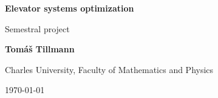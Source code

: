 \documentclass[10pt, a4paper]{article}
\begin{document}
\begin{titlepage}
    \begin{center}
        \vspace*{3cm}
            
        \Huge
        \textbf{Elevator systems optimization}
            
        \vspace{1cm}
        \huge
        Semestral project
            
        \vspace{1.5cm}
        \Large
            
        \textbf{Tomáš Tillmann}
            
        \vfill
        
        Charles University, Faculty of Mathematics and Physics 
            
        \vspace{1cm}
            
        \Large
        
        \today
            
    \end{center}
\end{titlepage}


\newpage
\end{document}

